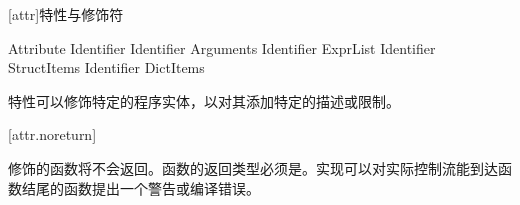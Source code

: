 
[attr]{特性与修饰符}

\begin{bnf}{Attribute}
     Identifier \br
     Identifier \terminal{(} Arguments\bnfq \terminal{)} \br
     Identifier \terminal{[} ExprList\bnfq \terminal{]} \br
     Identifier \terminal{\{} StructItems\bnfq \terminal{\}} \br
     Identifier \terminal{\{|} DictItems\bnfq \terminal{|\}}
\end{bnf}

\pnum
特性可以修饰特定的程序实体，以对其添加特定的描述或限制。

[attr.noreturn]{}

\pnum
{}修饰的函数将不会返回。函数的返回类型必须是。实现可以对实际控制流能到达函数结尾的函数提出一个警告或编译错误。
